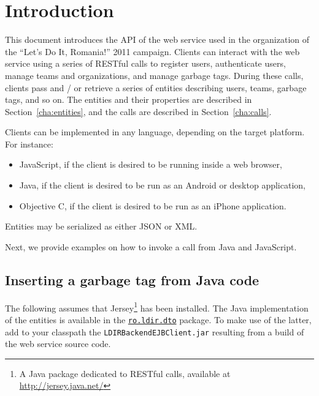 \chapter{Introduction}

This document introduces the API of the web service used in the organization of
the ``Let's Do It, Romania!'' 2011 campaign. Clients can interact with the web
service using a series of RESTful calls to register users, authenticate users,
manage teams and organizations, and manage garbage tags. During these calls,
clients pass and / or retrieve a series of entities describing users, teams,
garbage tags, and so on. The entities and their properties are described in
Section~\ref{cha:entities}, and the calls are described in
Section~\ref{cha:calls}. 

Clients can be implemented in any language, depending on the target platform.
For instance:
\begin{itemize}
  \item JavaScript, if the client is desired to be running inside a web
    browser,
  \item Java, if the client is desired to be run as an Android or desktop
    application,
  \item Objective C, if the client is desired to be run as an iPhone
    application.
\end{itemize}

Entities may be serialized as either JSON or XML.

Next, we provide examples on how to invoke a call from Java and JavaScript.

\section{Inserting a garbage tag from Java code}

The following assumes that Jersey\footnote{A Java package dedicated to RESTful
calls, available at \url{http://jersey.java.net/}} has been installed. The Java
implementation of the entities is available in the
\href{http://code.google.com/p/letsdoitromania2011/source/browse/#svn\%2Ftrunk\%2FWeb\%2FService\%2FLDIRBackendEJBClient\%2FejbModule\%2Fro\%2Fldir\%2Fdto}{\texttt{ro.ldir.dto}}
package. To make use of the latter, add to your classpath the
\texttt{LDIRBackendEJBClient.jar} resulting from a build of the web service
source code.


